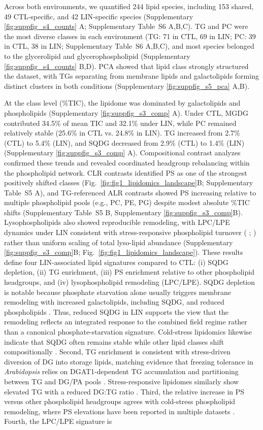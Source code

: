 \documentclass[9pt,twocolumn,twoside]{rilabRxiv}
\begin{document}
Across both environments, we quantified 244 lipid species, including 153 shared, 49 CTL-specific, and 42 LIN-specific species (Supplementary \ref{fig:suppfig_s4_counts} A; Supplementary Table~S6 A,B,C). TG and PC were the most diverse classes in each environment (TG: 71 in CTL, 69 in LIN; PC: 39 in CTL, 38 in LIN; Supplementary Table~S6 A,B,C), and most species belonged to the glycerolipid and glycerophospholipid (Supplementary \ref{fig:suppfig_s4_counts} B,D). PCA showed that lipid class strongly structured the dataset, with TGs separating from membrane lipids and galactolipids forming distinct clusters in both conditions (Supplementary \ref{fig:suppfig_s5_pca} A,B).

At the class level (\%TIC), the lipidome was dominated by galactolipids and phospholipids (Supplementary \ref{fig:suppfig_s3_comp} A). Under CTL, MGDG contributed 34.5\% of mean TIC and 32.1\% under LIN, while PC remained relatively stable (25.6\% in CTL vs. 24.8\% in LIN). TG increased from 2.7\% (CTL) to 5.4\% (LIN), and SQDG decreased from 2.9\% (CTL) to 1.4\% (LIN) (Supplementary \ref{fig:suppfig_s3_comp} A). Compositional contrast analyzes confirmed these trends and revealed coordinated headgroup rebalancing within the phospholipid network. CLR contrasts identified PS as one of the strongest positively shifted classes (Fig.~\ref{fig:fig1_lipidomics_landscape}B; Supplementary Table~S5 A), and TG-referenced ALR contrasts showed PS increasing relative to multiple phospholipid pools (e.g., PC, PE, PG) despite modest absolute \%TIC shifts (Supplementary Table~S5 B, Supplementary \ref{fig:suppfig_s3_comp}B). Lysophospholipids also showed reproducible remodeling, with LPC/LPE dynamics under LIN consistent with stress-responsive phospholipid turnover ( \cite{Hou2016}; \cite{Rawat2021}) rather than uniform scaling of total lyso-lipid abundance (Supplementary \ref{fig:suppfig_s3_comp}B; Fig.~\ref{fig:fig1_lipidomics_landscape}). These results define four LIN-associated lipid signatures compared to CTL: (i) SQDG depletion, (ii) TG enrichment, (iii) PS enrichment relative to other phospholipid headgroups, and (iv) lysophospholipid remodeling (LPC/LPE). SQDG depletion is notable because phosphate starvation alone usually triggers membrane remodeling with increased galactolipids, including SQDG, and reduced phospholipids \citep{Pfaff2020}. Thus, reduced SQDG in LIN supports the view that the remodeling reflects an integrated response to the combined field regime rather than a canonical phosphate-starvation signature. Cold-stress lipidomics likewise indicate that SQDG often remains stable while other lipid classes shift compositionally \citep{Yan2025}. Second, TG enrichment is consistent with stress-driven diversion of DG into storage lipids, matching evidence that freezing tolerance in \emph{Arabidopsis} relies on DGAT1-dependent TG accumulation and partitioning between TG and DG/PA pools \citep{Tan2018}. Stress-responsive lipidomes similarly show elevated TG with a reduced DG:TG ratio \citep{Yan2025,Pfaff2020}. Third, the relative increase in PS versus other phospholipid headgroups agrees with cold-stress phospholipid remodeling, where PS elevations have been reported in multiple datasets \citep{Yan2025,Zhang2020}. Fourth, the LPC/LPE signature is 
\end{document}
